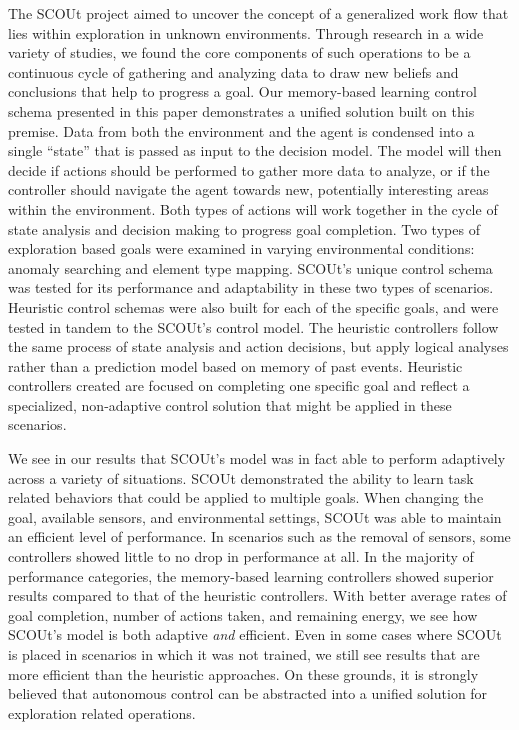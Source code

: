 The SCOUt project aimed to uncover the concept of a generalized work flow that lies within exploration in unknown environments.
Through research in a wide variety of studies, we found the core components of such operations to be a continuous cycle of gathering and analyzing data to draw new beliefs and conclusions that help to progress a goal.
Our memory-based learning control schema presented in this paper demonstrates a unified solution built on this premise.
Data from both the environment and the agent is condensed into a single ``state'' that is passed as input to the decision model.
The model will then decide if actions should be performed to gather more data to analyze, or if the controller should navigate the agent towards new, potentially interesting areas within the environment.
Both types of actions will work together in the cycle of state analysis and decision making to progress goal completion.
Two types of exploration based goals were examined in varying environmental conditions: anomaly searching and element type mapping.
SCOUt's unique control schema was tested for its performance and adaptability in these two types of scenarios.
Heuristic control schemas were also built for each of the specific goals, and were tested in tandem to the SCOUt's control model.
The heuristic controllers follow the same process of state analysis and action decisions, but apply logical analyses rather than a prediction model based on memory of past events.
Heuristic controllers created are focused on completing one specific goal and reflect a specialized, non-adaptive control solution that might be applied in these scenarios.

We see in our results that SCOUt's model was in fact able to perform adaptively across a variety of situations.
SCOUt demonstrated the ability to learn task related behaviors that could be applied to multiple goals.
When changing the goal, available sensors, and environmental settings, SCOUt was able to maintain an efficient level of performance.
In scenarios such as the removal of sensors, some controllers showed little to no drop in performance at all.
In the majority of performance categories, the memory-based learning controllers showed superior results compared to that of the heuristic controllers.
With better average rates of goal completion, number of actions taken, and remaining energy, we see how SCOUt's model is both adaptive \textit{and} efficient.
Even in some cases where SCOUt is placed in scenarios in which it was not trained, we still see results that are more efficient than the heuristic approaches.
On these grounds, it is strongly believed that autonomous control can be abstracted into a unified solution for exploration related operations.

